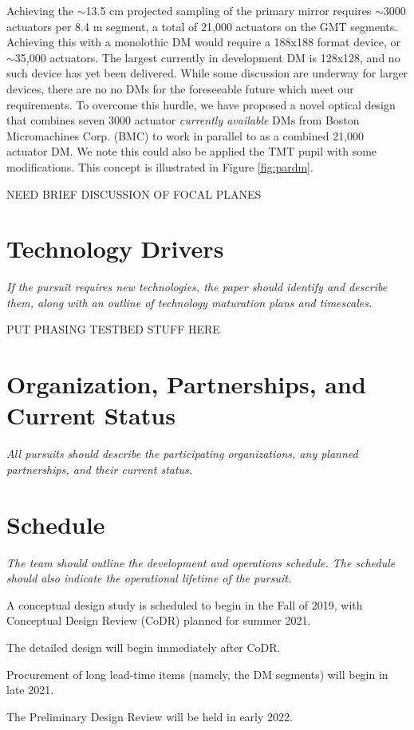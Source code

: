 \documentclass[12pt,preprint]{aastex}
\begin{document}
Achieving the $\sim$13.5 cm projected sampling of the primary mirror requires $\sim$3000 actuators per 8.4 m segment, a total of 21,000 actuators on the GMT segments.   Achieving this with a monolothic DM would require a 188x188 format device, or $\sim$35,000 actuators. The largest currently in development DM is 128x128, and no such device has yet been delivered.  While some discussion are underway for larger devices, there are no no DMs for the foreseeable future which meet our requirements. To overcome this hurdle, we have proposed a novel optical design that combines seven 3000 actuator \textit{currently available} DMs from Boston Micromachines Corp. (BMC) to work in parallel to as a combined 21,000 actuator DM. We note this could also be applied the TMT pupil with some modifications.  This concept is illustrated in Figure \ref{fig:pardm}.


NEED BRIEF DISCUSSION OF FOCAL PLANES

\section{Technology Drivers} 
\textit{If the pursuit requires new technologies, the paper should identify and
describe them, along with an outline of technology maturation plans and timescales.}

PUT PHASING TESTBED STUFF HERE

\section{Organization, Partnerships, and Current Status}  
\textit{All pursuits should describe the participating
organizations, any planned partnerships, and their current status.}

\section{Schedule}
\textit{The team should outline the development and operations schedule. The schedule
should also indicate the operational lifetime of the pursuit.}

A conceptual design study is scheduled to begin in the Fall of 2019, with Conceptual Design Review (CoDR) planned for summer 2021.  

The detailed design will begin immediately after CoDR.

Procurement of long lead-time items (namely, the DM segments) will begin in late 2021.  

The Preliminary Design Review will be held in early 2022.
\end{document}
